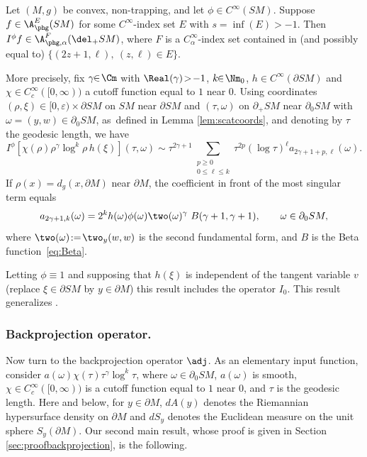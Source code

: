 \begin{Theorem} \label{thm:Calphamapping}
Let $(M,g)$ be convex, non-trapping, and let $\phi\in C^\infty(SM)$. Suppose $f \in \A^E_{\phg}(SM)$ for some $C^\infty$-index set $E$ with
$s = \inf(E)>-1$. Then $I^\phi f \in \A^F_{\phg,\alpha}(\del_+ SM)$, where $F$ is a $C^\infty_\alpha$-index set contained in
(and possibly equal to) $\{ (2z+1,\ell), \ (z,\ell)\in E \}$.

More precisely, fix $\gamma\!\!\in\! \Cm$ with $\Real(\gamma)\!>\!-1$, $k\!\!\in\! \Nm_0$, $h\!\!\in\! C^\infty(\partial SM)$ and $\chi\!\!\in\! C_c^\infty([0,\infty))$ a cutoff function equal to $1$ near $0$.
Using coordinates $(\rho,\xi)\in [0,\varepsilon)\times \partial SM$ on $SM$ near $\partial SM$ and $(\tau,\omega)$ on $\partial_+ SM$ near
$\partial_0 SM$ with $\omega = (y,w)\in \partial_0 SM$, as~defined in Lemma \ref{lem:scatcoords}, and denoting by $\tau$ the geodesic length, we have
\begin{equation*}
I^\phi [\chi(\rho)\rho^\gamma \log^k \rho\,h(\xi)] (\tau,\omega) \sim \tau^{2\gamma+1} \sum_{\substack{p\ge 0 \\ 0 \le \ell \le k}} \tau^{2p} (\log\tau)^\ell
a_{2\gamma+1+p,\ell}(\omega).
\end{equation*}
If $\rho(x) = d_g(x,\partial M)$ near $\partial M$, the coefficient in front of the most singular term equals
\begin{equation}
a_{2\gamma+1,k}(\omega) = 2^k h(\omega) \phi(\omega) \two(\omega)^\gamma\ B(\gamma+1,\gamma+1), \qquad \omega\in \partial_0 SM,
\label{eq:I0BottomTerm}
\end{equation}
where $\two(\omega) \!:=\! \two_y(w,w)$ is the second fundamental form, and $B$ is the Beta function~\eqref{eq:Beta}.
\end{Theorem}
Letting $\phi \equiv 1$ and supposing that $h(\xi)$ is independent of the tangent variable $v$ (\ie replace $\xi\in \partial SM$ by $y\in \partial M$)
this result includes the operator $I_0$. This result generalizes \cite[Prop.\,6.13]{Monard2020a}.

\subsubsection*{Backprojection operator.} Now turn to the backprojection operator $\adj $. As an elementary input function, consider
$a(\omega) \chi(\tau) \tau^\gamma \log^k \tau$, where $\omega\in\partial_0 SM$, $a(\omega)$
is smooth, $\chi \in C_c^\infty([0,\infty))$ is a cutoff function equal to $1$ near $0$, and $\tau$ is the geodesic length. Here and below, for $y\in \partial M$, $dA(y)$ denotes the Riemannian hypersurface density on $\partial M$ and $dS_y$ denotes the Euclidean measure on the unit sphere $S_y (\partial M)$. Our second main result, whose proof is given in Section \ref{sec:proofbackprojection}, is the following.

